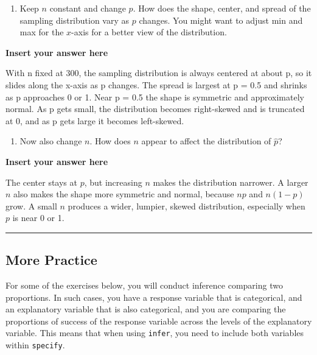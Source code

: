 \documentclass[
]{article}
\providecommand{\tightlist}{%
  \setlength{\itemsep}{0pt}\setlength{\parskip}{0pt}}
\begin{document}
\begin{enumerate}
\def\labelenumi{\arabic{enumi}.}
\setcounter{enumi}{6}
\tightlist
\item
  Keep \(n\) constant and change \(p\). How does the shape, center, and
  spread of the sampling distribution vary as \(p\) changes. You might
  want to adjust min and max for the \(x\)-axis for a better view of the
  distribution.
\end{enumerate}

\textbf{Insert your answer here}

With n fixed at 300, the sampling distribution is always centered at
about p, so it slides along the x-axis as p changes. The spread is
largest at p = 0.5 and shrinks as p approaches 0 or 1. Near p = 0.5 the
shape is symmetric and approximately normal. As p gets small, the
distribution becomes right-skewed and is truncated at 0, and as p gets
large it becomes left-skewed.

\begin{enumerate}
\def\labelenumi{\arabic{enumi}.}
\setcounter{enumi}{7}
\tightlist
\item
  Now also change \(n\). How does \(n\) appear to affect the
  distribution of \(\hat{p}\)?
\end{enumerate}

\textbf{Insert your answer here}

The center stays at \(p\), but increasing \(n\) makes the distribution
narrower. A larger \(n\) also makes the shape more symmetric and normal,
because \(np\) and \(n(1-p)\) grow. A small \(n\) produces a wider,
lumpier, skewed distribution, especially when \(p\) is near 0 or 1.

\begin{center}\rule{0.5\linewidth}{0.5pt}\end{center}

\subsection{More Practice}\label{more-practice}

For some of the exercises below, you will conduct inference comparing
two proportions. In such cases, you have a response variable that is
categorical, and an explanatory variable that is also categorical, and
you are comparing the proportions of success of the response variable
across the levels of the explanatory variable. This means that when
using \texttt{infer}, you need to include both variables within
\texttt{specify}.
\end{document}

